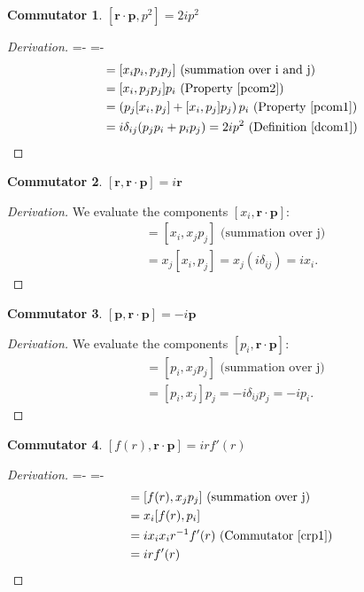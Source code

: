 \documentclass[12pt,a4paper]{report}
\theoremstyle{definition}
\newtheorem{commutator}{Commutator}[section]
\newenvironment{derivation}
  {\renewcommand\qedsymbol{$\square$}\begin{proof}[Derivation]}
  {\end{proof}}
\theoremstyle{remark}
\theoremstyle{remark}
\begin{document}
\begin{appendices}
\begin{commutator}\label{crp5}
$[\textbf{r}\cdot\textbf{p},p^2]=2i p^2$
\end{commutator}
\begin{derivation}
\abovedisplayskip=-\baselineskip
\belowdisplayskip=0pt
\abovedisplayshortskip=-\baselineskip
\belowdisplayshortskip=0pt
\begin{align*}
[\textbf{r}\cdot\textbf{p},p^2] &= [x_ip_i,p_jp_j] \text{ (summation over i and j)} \\
&= [x_i,p_jp_j]p_i \text{ (Property~\ref{pcom2})}\\
&= \left(p_j[x_i,p_j]+[x_i,p_j]p_j\right)p_i \text{ (Property~\ref{pcom1})} \\
&= i\delta_{ij}(p_jp_i+p_ip_j) = 2i p^2 \text{ (Definition~\ref{dcom1})}
\end{align*}
\end{derivation}

\begin{commutator}\label{crp6}
$[\textbf{r},\textbf{r}\cdot\textbf{p}]=i \textbf{r}$
\end{commutator}
\begin{derivation}
We evaluate the components $[x_i,\textbf{r}\cdot\textbf{p}]$:
\begin{align*}
[x_i,\textbf{r}\cdot\textbf{p}] &= [x_i,x_jp_j] \text{ (summation over j)} \\
&= x_j[x_i,p_j]=x_j(i\delta_{ij})=i x_i.
\end{align*}
\end{derivation}

\begin{commutator}\label{crp7}
$[\textbf{p},\textbf{r}\cdot\textbf{p}]=-i \textbf{p}$
\end{commutator}
\begin{derivation}
We evaluate the components $[p_i,\textbf{r}\cdot\textbf{p}]$:
\begin{align*}
[p_i,\textbf{r}\cdot\textbf{p}] &= [p_i,x_jp_j] \text{ (summation over j)} \\
&= [p_i,x_j]p_j=-i\delta_{ij}p_j=-i p_i.
\end{align*}
\end{derivation}

\begin{commutator}\label{crp8}
$[f(r),\textbf{r}\cdot\textbf{p}]=i rf'(r)$
\end{commutator}
\begin{derivation}
\abovedisplayskip=-\baselineskip
\belowdisplayskip=0pt
\abovedisplayshortskip=-\baselineskip
\belowdisplayshortskip=0pt
\begin{align*}
[f(r),\textbf{r}\cdot\textbf{p}] &= [f(r),x_jp_j] \text{ (summation over j)} \\
&= x_i[f(r),p_i] \\
&= i x_ix_ir^{-1}f'(r) \text{ (Commutator~\ref{crp1})} \\
&= i rf'(r)
\end{align*}
\end{derivation}


\end{appendices}
\end{document}

